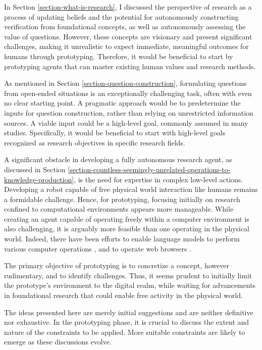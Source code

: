\documentclass{article}
\begin{document}
In Section \ref{section-what-is-research}, I discussed the perspective of research as a process of updating beliefs and the potential for autonomously constructing verification from foundational concepts, as well as autonomously assessing the value of questions. However, these concepts are visionary and present significant challenges, making it unrealistic to expect immediate, meaningful outcomes for humans through prototyping. Therefore, it would be beneficial to start by prototyping agents that can master existing human values and research methods.

As mentioned in Section \ref{section-question-construction}, formulating questions from open-ended situations is an exceptionally challenging task, often with even no clear starting point. A pragmatic approach would be to predetermine the inputs for question construction, rather than relying on unrestricted information sources. A viable input could be a high-level goal, commonly assumed in many studies. Specifically, it would be beneficial to start with high-level goals recognized as research objectives in specific research fields.

A significant obstacle in developing a fully autonomous research agent, as discussed in Section \ref{section-countless-seemingly-unrelated-operations-to-knowledge-production}, is the need for expertise in complex low-level actions. Developing a robot capable of free physical world interaction like humans remains a formidable challenge. Hence, for prototyping, focusing initially on research confined to computational environments appears more manageable. While creating an agent capable of operating freely within a computer environment is also challenging, it is arguably more feasible than one operating in the physical world. Indeed, there have been efforts to enable language models to perform various computer operations \cite{openinterpreter,openai_chatgpt_plugins_code_interpreter_2023}, and to operate web browsers \cite{nakano2021webgpt,act1}.

The primary objective of prototyping is to concretize a concept, however rudimentary, and to identify challenges. Thus, it seems prudent to initially limit the prototype's environment to the digital realm, while waiting for advancements in foundational research that could enable free activity in the physical world.

The ideas presented here are merely initial suggestions and are neither definitive nor exhaustive. In the prototyping phase, it is crucial to discuss the extent and nature of the constraints to be applied. More suitable constraints are likely to emerge as these discussions evolve.
\end{document}
